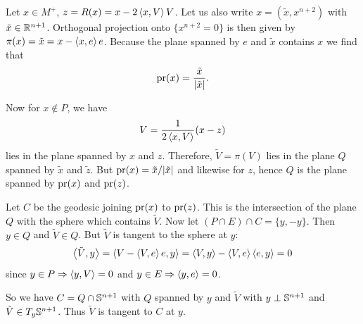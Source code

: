 \documentclass{amsart}
\begin{document}
Let \(x \in M^+\), \(z = R(x) = x - 2\inpr{x}{V} V\). Let us also write \(x = (\tilde{x}, x^{n+2})\) with \(\tilde{x} \in \R^{n+1}\). Orthogonal projection onto \(\{x^{n+2} = 0\}\) is then given by \(\pi (x) = \tilde{x} = x - \inpr{x}{e} e\). Because the plane spanned by \(e\) and \(\tilde{x}\) contains \(x\) we find that
\[
\pr (x) = \frac{\tilde{x}}{|\tilde{x}|}.
\]

Now for \(x \notin P\), we have
\[
V = \frac{1}{2\inpr{x}{V}} (x - z)
\]
lies in the plane spanned by \(x\) and \(z\). Therefore, \(\tilde V = \pi(V)\) lies in the plane \(Q\) spanned by \(\tilde{x}\) and \(\tilde{z}\). But \(\pr(x) = \tilde{x}/|\tilde{x}|\) and likewise for \(z\), hence \(Q\) is the plane spanned by \(\pr(x)\) and \(\pr(z)\).

Let \(C\) be the geodesic joining \(\pr(x)\) to \(\pr(z)\). This is the intersection of the plane \(Q\) with the sphere which contains \(\tilde{V}\). Now let \((P \cap E) \cap C = \{y,-y\}\). Then \(y \in Q\) and \(\tilde{V} \in Q\). But \(\tilde{V}\) is tangent to the sphere at \(y\):
\[
\inpr{\tilde{V}}{y} = \inpr{V - \inpr{V}{e}e}{y} = \inpr{V}{y} - \inpr{V}{e} \inpr{e}{y} = 0
\]
since \(y \in P \Rightarrow \inpr{y}{V} = 0\) and \(y \in E \Rightarrow \inpr{y}{e} = 0\).

So we have \(C = Q \cap \S^{n+1}\) with \(Q\) spanned by \(y\) and \(\tilde{V}\) with \(y\perp \S^{n+1}\) and \(\tilde{V} \in T_y \S^{n+1}\). Thus \(\tilde{V}\) is tangent to \(C\) at \(y\).
\end{document}
